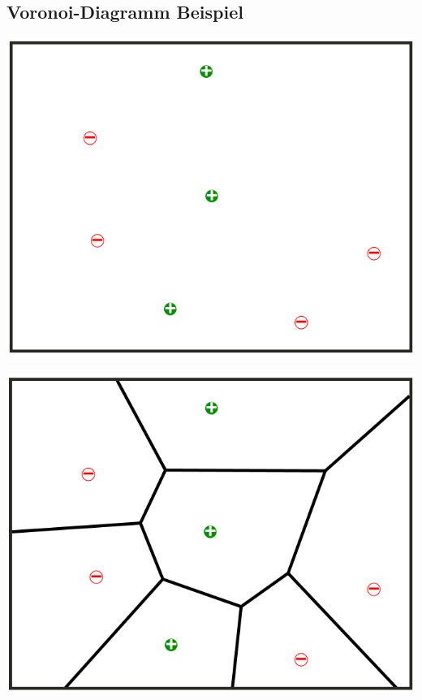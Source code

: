\documentclass[fontsize=11pt]{scrartcl}
\newenvironment{Figure}
  {\par\medskip\noindent\minipage{\linewidth}}
  {\endminipage\par\medskip}
\begin{document}
        \subsection{Voronoi-Diagramm Beispiel}
            \begin{Figure}
                \begin{minipage}[b]{.4\linewidth}
                    \includegraphics[width=\linewidth]{vor1.png}
                \end{minipage}
                \hspace*{.1\linewidth}
                \begin{minipage}[b]{.4\linewidth}
                    \includegraphics[width=\linewidth]{vor2.png}
                \end{minipage}
            \end{Figure}
            
\end{document}
